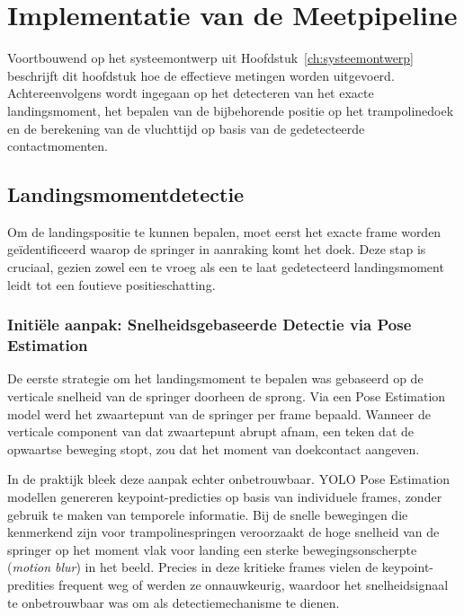 
\chapter{Implementatie van de Meetpipeline}
\label{ch:meetpipeline}

Voortbouwend op het systeemontwerp uit Hoofdstuk~\ref{ch:systeemontwerp} beschrijft dit hoofdstuk hoe de effectieve metingen worden uitgevoerd. Achtereenvolgens wordt ingegaan op het detecteren van het exacte landingsmoment, het bepalen van de bijbehorende positie op het trampolinedoek en de berekening van de vluchttijd op basis van de gedetecteerde contactmomenten.


\section{Landingsmomentdetectie}
\label{sec:landingsmoment}

Om de landingspositie te kunnen bepalen, moet eerst het exacte frame worden ge{\"i}dentificeerd waarop de springer in aanraking komt het doek. Deze stap is cruciaal, gezien zowel een te vroeg als een te laat gedetecteerd landingsmoment leidt tot een foutieve positieschatting.

\subsection{Initi{\"e}le aanpak: Snelheidsgebaseerde Detectie via Pose Estimation}
\label{subsec:landingsmoment-pose}

De eerste strategie om het landingsmoment te bepalen was gebaseerd op de verticale snelheid van de springer doorheen de sprong. Via een Pose Estimation model werd het zwaartepunt van de springer per frame bepaald. Wanneer de verticale component van dat zwaartepunt abrupt afnam, een teken dat de opwaartse beweging stopt, zou dat het moment van doekcontact aangeven.

In de praktijk bleek deze aanpak echter onbetrouwbaar. YOLO Pose Estimation modellen genereren keypoint-predicties op basis van individuele frames, zonder gebruik te maken van temporele informatie. Bij de snelle bewegingen die kenmerkend zijn voor trampolinespringen veroorzaakt de hoge snelheid van de springer op het moment vlak voor landing een sterke bewegingsonscherpte (\textit{motion blur}) in het beeld. Precies in deze kritieke frames vielen de keypoint-predities frequent weg of werden ze onnauwkeurig, waardoor het snelheidsignaal te onbetrouwbaar was om als detectiemechanisme te dienen.

